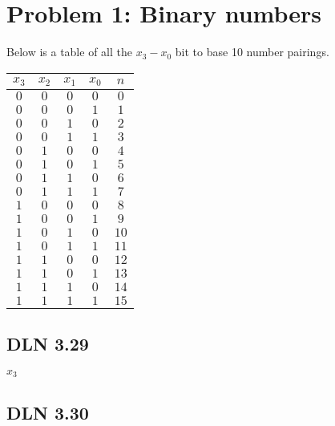 \documentclass[titlepage]{article}
\begin{document}
 \maketitle

\section{Problem 1: Binary numbers}

Below is a table of all the \(x_3-x_0\) bit to base 10 number pairings.

\begin{center}
\begin{tabular}{c c c c|c}
\textbf{$x_3$} & \textbf{$x_2$} & \textbf{$x_1$} & \textbf{$x_0$} & \textbf{$n$} \\ \hline
\(0\) & \(0\) & \(0\) & \(0\) & \(0\)\\
\(0\) & \(0\) & \(0\) & \(1\) & \(1\)\\
\(0\) & \(0\) & \(1\) & \(0\) & \(2\)\\
\(0\) & \(0\) & \(1\) & \(1\) & \(3\)\\
\(0\) & \(1\) & \(0\) & \(0\) & \(4\)\\
\(0\) & \(1\) & \(0\) & \(1\) & \(5\)\\
\(0\) & \(1\) & \(1\) & \(0\) & \(6\)\\
\(0\) & \(1\) & \(1\) & \(1\) & \(7\)\\
\(1\) & \(0\) & \(0\) & \(0\) & \(8\)\\
\(1\) & \(0\) & \(0\) & \(1\) & \(9\)\\
\(1\) & \(0\) & \(1\) & \(0\) & \(10\)\\
\(1\) & \(0\) & \(1\) & \(1\) & \(11\)\\
\(1\) & \(1\) & \(0\) & \(0\) & \(12\)\\
\(1\) & \(1\) & \(0\) & \(1\) & \(13\)\\
\(1\) & \(1\) & \(1\) & \(0\) & \(14\)\\
\(1\) & \(1\) & \(1\) & \(1\) & \(15\)\\

\end{tabular}
\end{center}

\subsection{DLN 3.29}  %

$x_3$

\subsection{DLN 3.30} 
\end{document}
